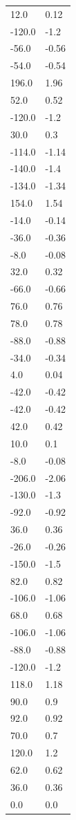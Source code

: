 \begin{longtable}{ll}
12.0 & 0.12 \\
-120.0 & -1.2 \\
-56.0 & -0.56 \\
-54.0 & -0.54 \\
196.0 & 1.96 \\
52.0 & 0.52 \\
-120.0 & -1.2 \\
30.0 & 0.3 \\
-114.0 & -1.14 \\
-140.0 & -1.4 \\
-134.0 & -1.34 \\
154.0 & 1.54 \\
-14.0 & -0.14 \\
-36.0 & -0.36 \\
-8.0 & -0.08 \\
32.0 & 0.32 \\
-66.0 & -0.66 \\
76.0 & 0.76 \\
78.0 & 0.78 \\
-88.0 & -0.88 \\
-34.0 & -0.34 \\
4.0 & 0.04 \\
-42.0 & -0.42 \\
-42.0 & -0.42 \\
42.0 & 0.42 \\
10.0 & 0.1 \\
-8.0 & -0.08 \\
-206.0 & -2.06 \\
-130.0 & -1.3 \\
-92.0 & -0.92 \\
36.0 & 0.36 \\
-26.0 & -0.26 \\
-150.0 & -1.5 \\
82.0 & 0.82 \\
-106.0 & -1.06 \\
68.0 & 0.68 \\
-106.0 & -1.06 \\
-88.0 & -0.88 \\
-120.0 & -1.2 \\
118.0 & 1.18 \\
90.0 & 0.9 \\
92.0 & 0.92 \\
70.0 & 0.7 \\
120.0 & 1.2 \\
62.0 & 0.62 \\
36.0 & 0.36 \\
0.0 & 0.0 \\

\end{longtable}
